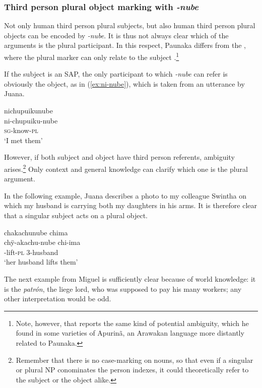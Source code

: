  \subsubsection{Third person plural object marking with \textit{-nube}} Not only human third person plural subjects, but also human third person plural objects can be encoded by \textit{-nube}. It is thus not always clear which of the arguments is the plural participant. In this respect, Paunaka differs from the , where the plural marker can only relate to the subject \citep[474--475]{Rose2011a}.\footnote{Note, however, that \citet[382-384, Footnote 1]{Facundes2000} reports the same kind of potential ambiguity, which he found in some varieties of Apurinã, an Arawakan language more distantly related to Paunaka.} 
 
 If the subject is an SAP, the only participant to which \textit{-nube} can refer is obviously the object, as in (\ref{ex:ni-nube}), which is taken from an utterance by Juana.
  
 \ea\label{ex:ni-nube}
\begingl 
\glpreamble nichupuikunube\\
\gla ni-chupuiku-nube\\ 
\textsc{sg}-know-\textsc{pl}\\ 
\glft ‘I met them’\\ 
\endgl
\trailingcitation{[jxx-p120515l-1.218]}
\xe

However, if both subject and object have third person referents, ambiguity arises.\footnote{Remember that there is no case-marking on nouns, so that even if a singular or plural NP conominates the person indexes, it could theoretically refer to the subject or the object alike.} Only context and general knowledge can clarify which one is the plural argument.

In the following example, Juana describes a photo to my colleague Swintha on which my husband is carrying both my daughters in his arms. It is therefore clear that a singular subject acts on a plural object.

\ea\label{ex:3sg-3pl-1}
\begingl 
\glpreamble chakachunube chima\\
\gla chÿ-akachu-nube chi-ima\\ 
-lift-\textsc{pl} 3-husband\\ 
\glft ‘her husband lifts them’\\ 
\endgl
\trailingcitation{[jxx-p141024s-1.31]}
\xe

The next example from Miguel is sufficiently clear because of world knowledge: it is the \textit{patrón}, the liege lord, who was supposed to pay his many workers; any other interpretation would be odd.

